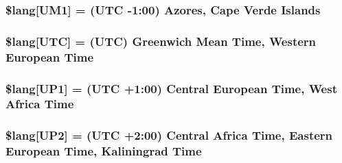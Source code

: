 \subsubsection[{\$lang}]{\setlength{\rightskip}{0pt plus 5cm}\$lang\mbox{[}\textquotesingle{}U\+M1\textquotesingle{}\mbox{]} = \textquotesingle{}(U\+T\+C -\/1\+:00) Azores, Cape Verde Islands\textquotesingle{}}\label{system_2language_2english_2date__lang_8php_a036e0074236b996b33231b051eda2973}
\hypertarget{system_2language_2english_2date__lang_8php_ab153b3219e74743184b7dee67e86f9fc}{}
\subsubsection[{\$lang}]{\setlength{\rightskip}{0pt plus 5cm}\$lang\mbox{[}\textquotesingle{}U\+T\+C\textquotesingle{}\mbox{]} = \textquotesingle{}(U\+T\+C) Greenwich Mean Time, Western European Time\textquotesingle{}}\label{system_2language_2english_2date__lang_8php_ab153b3219e74743184b7dee67e86f9fc}
\hypertarget{system_2language_2english_2date__lang_8php_a788996558e6c8cafd788a1fef6b0be4e}{}
\subsubsection[{\$lang}]{\setlength{\rightskip}{0pt plus 5cm}\$lang\mbox{[}\textquotesingle{}U\+P1\textquotesingle{}\mbox{]} = \textquotesingle{}(U\+T\+C +1\+:00) Central European Time, West Africa Time\textquotesingle{}}\label{system_2language_2english_2date__lang_8php_a788996558e6c8cafd788a1fef6b0be4e}
\hypertarget{system_2language_2english_2date__lang_8php_adfeba045961d07f8f30c0f1a7b8b4ff9}{}
\subsubsection[{\$lang}]{\setlength{\rightskip}{0pt plus 5cm}\$lang\mbox{[}\textquotesingle{}U\+P2\textquotesingle{}\mbox{]} = \textquotesingle{}(U\+T\+C +2\+:00) Central Africa Time, Eastern European Time, Kaliningrad Time\textquotesingle{}}\label{system_2language_2english_2date__lang_8php_adfeba045961d07f8f30c0f1a7b8b4ff9}
\hypertarget{system_2language_2english_2date__lang_8php_a5eddd4b83edcbefcc883077949d40a67}{}
